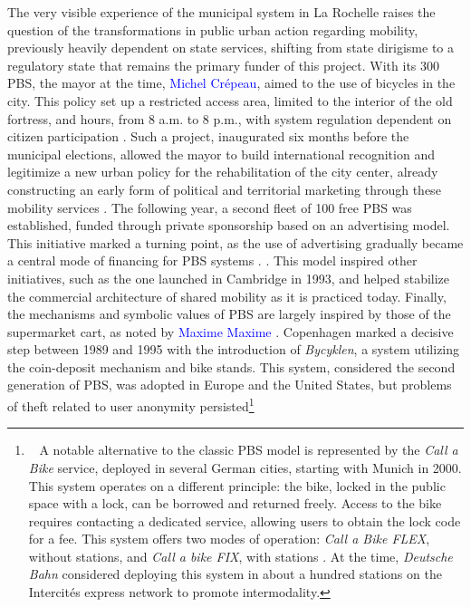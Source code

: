 \begin{refsegment}
{    The very visible experience of the municipal system in La Rochelle raises the question of the transformations in public urban action regarding mobility, previously heavily dependent on state services, shifting from state dirigisme to a regulatory state that remains the primary funder of this project. With its 300 \acrshort{PBS}, the mayor at the time, \textcolor{blue}{Michel Crépeau}, aimed to  the use of bicycles in the city. This policy set up a restricted access area, limited to the interior of the old fortress, and hours, from 8 a.m. to 8 p.m., with system regulation dependent on citizen participation \textcolor{blue}{\autocite[31]{hure_mobilites_2019}}. Such a project, inaugurated six months before the municipal elections, allowed the mayor to build international recognition and legitimize a new urban policy for the rehabilitation of the city center, already constructing an early form of political and territorial marketing through these mobility services \textcolor{blue}{\autocite[31]{hure_mobilites_2019}}. The following year, a second fleet of 100 free \acrshort{PBS} was established, funded through private sponsorship based on an advertising model. This initiative marked a turning point, as the use of advertising gradually became a central mode of financing for \acrshort{PBS} systems \textcolor{blue}{\autocite[32-35]{fleury_mobilites_2022}}.
}. This model inspired other initiatives, such as the one launched in Cambridge in 1993, and helped stabilize the commercial architecture of shared mobility as it is practiced today. Finally, the mechanisms and symbolic values of \acrshort{PBS} are largely inspired by those of the supermarket cart, as noted by \textcolor{blue}{Maxime} \textcolor{blue}{Maxime} \textcolor{blue}{\textcite[40]{hure_mobilites_2019}}. Copenhagen marked a decisive step between 1989 and 1995 with the introduction of \textsl{Bycyklen}, a system utilizing the coin-deposit mechanism and bike stands. This system, considered the second generation of \acrshort{PBS}, was adopted in Europe and the United States, but problems of theft related to user anonymity persisted\footnote{~
    A notable alternative to the classic \acrshort{PBS} model is represented by the \textsl{Call a Bike} service, deployed in several German cities, starting with Munich in 2000. This system operates on a different principle: the bike, locked in the public space with a lock, can be borrowed and returned freely. Access to the bike requires contacting a dedicated service, allowing users to obtain the lock code for a fee. This system offers two modes of operation: \textsl{Call a Bike FLEX}, without stations, and \textsl{Call a bike FIX}, with stations \textcolor{blue}{\autocite[18]{6t-bureau_de_recherche_etude_2018}}. At the time, \textsl{Deutsche Bahn} considered deploying this system in about a hundred stations on the Intercités express network to promote intermodality.
}
\end{refsegment}
